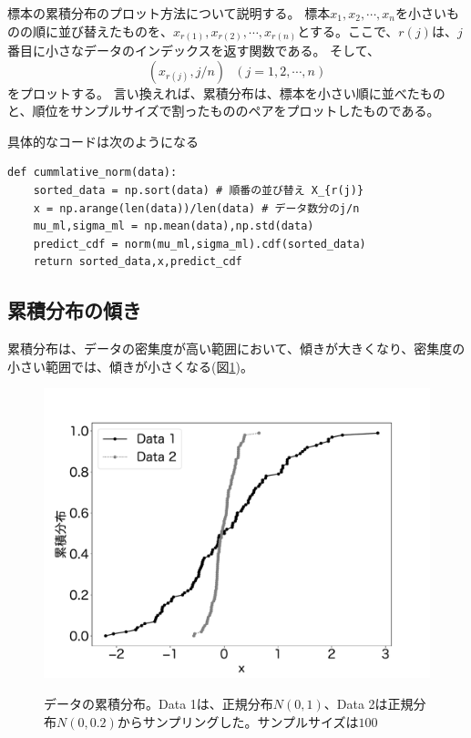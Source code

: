 標本の累積分布のプロット方法について説明する。
標本$x_1,x_2,\cdots,x_n$を小さいものの順に並び替えたものを、$x_{r(1)},x_{r(2)},\cdots,x_{r(n)}$とする。ここで、$r(j)$は、$j$番目に小さなデータのインデックスを返す関数である。
そして、
\begin{equation*}\label{commlative_rank_eq}
    (x_{r(j)},j/n) \ \ \ (j=1,2,\cdots,n)
\end{equation*}
をプロットする。
言い換えれば、累積分布は、標本を小さい順に並べたものと、順位をサンプルサイズで割ったもののペアをプロットしたものである。

具体的なコードは次のようになる
\begin{lstlisting}
def cummlative_norm(data):
    sorted_data = np.sort(data) # 順番の並び替え X_{r(j)}
    x = np.arange(len(data))/len(data) # データ数分のj/n 
    mu_ml,sigma_ml = np.mean(data),np.std(data)
    predict_cdf = norm(mu_ml,sigma_ml).cdf(sorted_data)
    return sorted_data,x,predict_cdf
\end{lstlisting}

\subsection{累積分布の傾き}
累積分布は、データの密集度が高い範囲において、傾きが大きくなり、密集度の小さい範囲では、傾きが小さくなる(図\ref{fig:qq_ccummlative_data_example_normummlative})。


\begin{figure}
 \begin{center}
  \includegraphics[width=15cm]{./image/12_/cummlative_data_example_norm.pdf}
  \label{fig:qq_ccummlative_data_example_normummlative}
  \caption{データの累積分布。Data 1は、正規分布$N(0,1)$、Data 2は正規分布$N(0,0.2)$からサンプリングした。サンプルサイズは$100$}
 \end{center}
\end{figure}


